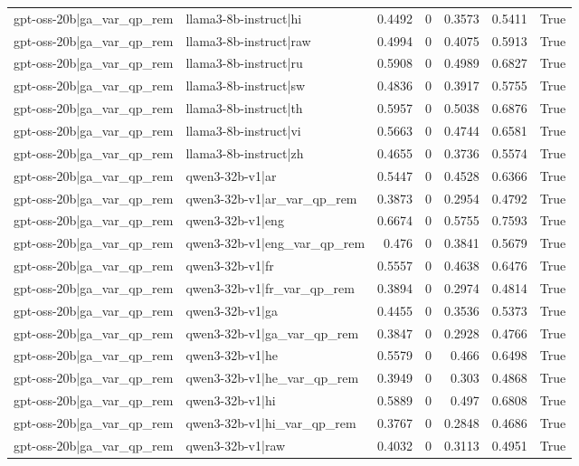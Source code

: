 \begin{table}
\begin{tabular}{l l r r r r l}
gpt-oss-20b|ga_var_qp_rem & llama3-8b-instruct|hi & 0.4492 & 0 & 0.3573 & 0.5411 & True \\
gpt-oss-20b|ga_var_qp_rem & llama3-8b-instruct|raw & 0.4994 & 0 & 0.4075 & 0.5913 & True \\
gpt-oss-20b|ga_var_qp_rem & llama3-8b-instruct|ru & 0.5908 & 0 & 0.4989 & 0.6827 & True \\
gpt-oss-20b|ga_var_qp_rem & llama3-8b-instruct|sw & 0.4836 & 0 & 0.3917 & 0.5755 & True \\
gpt-oss-20b|ga_var_qp_rem & llama3-8b-instruct|th & 0.5957 & 0 & 0.5038 & 0.6876 & True \\
gpt-oss-20b|ga_var_qp_rem & llama3-8b-instruct|vi & 0.5663 & 0 & 0.4744 & 0.6581 & True \\
gpt-oss-20b|ga_var_qp_rem & llama3-8b-instruct|zh & 0.4655 & 0 & 0.3736 & 0.5574 & True \\
gpt-oss-20b|ga_var_qp_rem & qwen3-32b-v1|ar & 0.5447 & 0 & 0.4528 & 0.6366 & True \\
gpt-oss-20b|ga_var_qp_rem & qwen3-32b-v1|ar_var_qp_rem & 0.3873 & 0 & 0.2954 & 0.4792 & True \\
gpt-oss-20b|ga_var_qp_rem & qwen3-32b-v1|eng & 0.6674 & 0 & 0.5755 & 0.7593 & True \\
gpt-oss-20b|ga_var_qp_rem & qwen3-32b-v1|eng_var_qp_rem & 0.476 & 0 & 0.3841 & 0.5679 & True \\
gpt-oss-20b|ga_var_qp_rem & qwen3-32b-v1|fr & 0.5557 & 0 & 0.4638 & 0.6476 & True \\
gpt-oss-20b|ga_var_qp_rem & qwen3-32b-v1|fr_var_qp_rem & 0.3894 & 0 & 0.2974 & 0.4814 & True \\
gpt-oss-20b|ga_var_qp_rem & qwen3-32b-v1|ga & 0.4455 & 0 & 0.3536 & 0.5373 & True \\
gpt-oss-20b|ga_var_qp_rem & qwen3-32b-v1|ga_var_qp_rem & 0.3847 & 0 & 0.2928 & 0.4766 & True \\
gpt-oss-20b|ga_var_qp_rem & qwen3-32b-v1|he & 0.5579 & 0 & 0.466 & 0.6498 & True \\
gpt-oss-20b|ga_var_qp_rem & qwen3-32b-v1|he_var_qp_rem & 0.3949 & 0 & 0.303 & 0.4868 & True \\
gpt-oss-20b|ga_var_qp_rem & qwen3-32b-v1|hi & 0.5889 & 0 & 0.497 & 0.6808 & True \\
gpt-oss-20b|ga_var_qp_rem & qwen3-32b-v1|hi_var_qp_rem & 0.3767 & 0 & 0.2848 & 0.4686 & True \\
gpt-oss-20b|ga_var_qp_rem & qwen3-32b-v1|raw & 0.4032 & 0 & 0.3113 & 0.4951 & True \\

\end{tabular}
\end{table}
